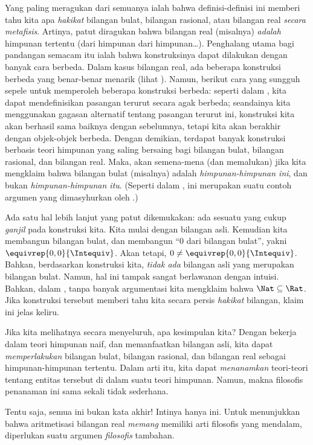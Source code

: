 \documentclass[../../../include/open-logic-section]{subfiles}
\begin{document}
Yang paling meragukan dari semuanya ialah bahwa definisi-definisi ini memberi
tahu kita apa \emph{hakikat} bilangan bulat, bilangan rasional, atau bilangan
real \emph{secara metafisis}. Artinya, patut diragukan bahwa bilangan real
(misalnya) \emph{adalah} himpunan tertentu (dari himpunan dari
himpunan\ldots). Penghalang utama bagi pandangan semacam itu ialah bahwa
konstruksinya dapat dilakukan dengan banyak cara berbeda. Dalam kasus
bilangan real, ada beberapa konstruksi berbeda yang benar-benar menarik (lihat
). Namun, berikut cara yang sungguh sepele untuk memperoleh
beberapa konstruksi berbeda: seperti dalam , kita
dapat mendefinisikan pasangan terurut secara agak berbeda; seandainya kita
menggunakan gagasan alternatif tentang pasangan terurut ini, konstruksi kita
akan berhasil sama baiknya dengan sebelumnya, tetapi kita akan berakhir
dengan objek-objek berbeda. Dengan demikian, terdapat banyak konstruksi
berbasis teori himpunan yang saling bersaing bagi bilangan bulat, bilangan rasional,
dan bilangan real. Maka, akan semena-mena (dan memalukan) jika kita mengklaim
bahwa bilangan bulat (misalnya) adalah \emph{himpunan-himpunan ini}, dan bukan
\emph{himpunan-himpunan itu}. (Seperti dalam , ini
merupakan suatu contoh argumen yang dimasyhurkan oleh
\citealt{Benacerraf1965}.)

Ada satu hal lebih lanjut yang patut dikemukakan: ada sesuatu yang cukup
\emph{ganjil} pada konstruksi kita. Kita mulai dengan bilangan asli. Kemudian
kita membangun bilangan bulat, dan membangun ``$0$ dari bilangan bulat'',
yakni $ \equivrep{0,0}{\Intequiv}$. Akan tetapi, $0 \neq
\equivrep{0,0}{\Intequiv}$. Bahkan, berdasarkan konstruksi kita,
\emph{tidak ada} bilangan asli yang merupakan bilangan bulat. Namun, hal ini
tampak sangat berlawanan dengan intuisi. Bahkan, dalam
, tanpa banyak argumentasi kita mengklaim bahwa
$\Nat \subseteq \Rat$. Jika konstruksi tersebut memberi tahu kita secara
persis \emph{hakikat} bilangan, klaim ini jelas keliru.

Jika kita melihatnya secara menyeluruh, apa kesimpulan kita? Dengan bekerja dalam
teori himpunan naif, dan memanfaatkan bilangan asli, kita dapat
\emph{memperlakukan} bilangan bulat, bilangan rasional, dan bilangan real
sebagai himpunan-himpunan tertentu. Dalam arti itu, kita dapat
\emph{menanamkan} teori-teori tentang entitas tersebut di dalam suatu teori
himpunan. Namun, makna filosofis penanaman ini sama sekali tidak sederhana.

Tentu saja, semua ini bukan kata akhir!{} Intinya hanya ini. Untuk menunjukkan
bahwa aritmetisasi bilangan real \emph{memang} memiliki arti filosofis yang
mendalam, diperlukan suatu argumen \emph{filosofis} tambahan.

\end{document}
